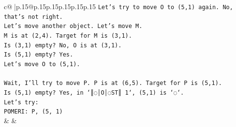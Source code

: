 \documentclass{article}
\begin{document}
{\begin{supertabular}{c@{$\;$}|p{.15\linewidth}@{}p{.15\linewidth}p{.15\linewidth}p{.15\linewidth}p{.15\linewidth}p{.15\linewidth}}
{{{\texttt{Let's try to move O to (5,1) again. No, that's not right.} \\
\texttt{Let's move another object. Let's move M.} \\
\texttt{M is at (2,4). Target for M is (3,1).} \\
\texttt{Is (3,1) empty? No, O is at (3,1).} \\
\texttt{Is (5,1) empty? Yes.} \\
\texttt{Let's move O to (5,1).} \\
\\ 
\texttt{Wait, I'll try to move P. P is at (6,5). Target for P is (5,1).} \\
\texttt{Is (5,1) empty? Yes, in `║◌│O│◌ST║ 1`, (5,1) is `◌`.} \\
\texttt{Let's try:} \\
\texttt{POMERI: P, (5, 1)} \\
            }
        }
    }
    & & \\ \\


\end{supertabular}}
\end{document}
